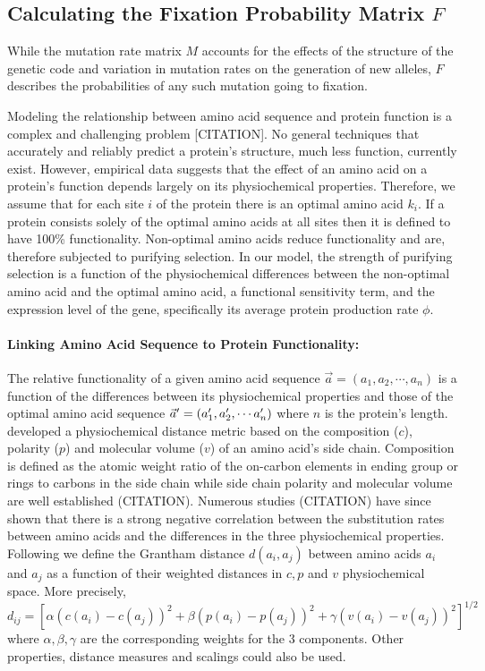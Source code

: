 \subsection*{Calculating the Fixation Probability Matrix $F$}
While the mutation rate matrix $M$ accounts for the effects of the structure of the genetic code and variation in mutation rates on the generation of new alleles,  $F$ describes the probabilities of any such mutation going to fixation.

Modeling the relationship between amino acid sequence and protein function is a complex and challenging problem [CITATION].
No general techniques that accurately and reliably predict a protein's structure, much less function, currently exist.
However, empirical data suggests that the effect of an amino acid on a protein's function depends largely on its physiochemical properties.
Therefore, we assume that for each site $i$ of the protein there is an optimal amino acid $k_i$.
If a protein consists solely of the optimal amino acids at all sites then it is defined to have 100\% functionality. Non-optimal amino acids reduce functionality and are, therefore subjected to purifying selection.
In our model, the strength of purifying selection is a function of the physiochemical differences between the non-optimal amino acid and the optimal amino acid, a functional sensitivity term, and the expression level of the gene, specifically its average protein production rate $\phi$.


\paragraph*{Linking Amino Acid Sequence to  Protein Functionality:}
The relative functionality of a given amino acid sequence $\vec{a} = (a_1, a_2, \cdots, a_n)$  is a function of the differences between its physiochemical properties and those of the optimal amino acid sequence $\vec{a}^\prime = (a^\prime_1, a^\prime_2, \cdots a^\prime_n)$ where $n$ is the protein's length. 
\citet{grantham1974} developed a physiochemical distance metric based on the composition ($c$), polarity ($p$) and molecular volume ($v$) of an amino acid's side chain. 
Composition is defined as the atomic weight ratio of the on-carbon elements in ending group or rings to carbons in the side chain while side chain polarity and molecular volume are well established (CITATION). 
Numerous studies (CITATION) have since shown that there is a strong negative correlation between the substitution rates between amino acids and the differences in the three physiochemical properties. 
Following \citet{grantham1974} we define the Grantham distance $d(a_i, a_j)$ between amino acids $a_i$ and $a_j$ as a function of their weighted distances in $c, p$ and $v$ physiochemical space.
More precisely, $d_{ij} = [\alpha (c(a_i)-c(a_j))^2 + \beta (p(a_i) - p(a_j))^2 + \gamma (v(a_i) - v(a_j))^2]^{1/2}$ where $\alpha, \beta, \gamma$ are the corresponding weights for the 3 components. 
Other properties, distance measures and scalings could also be used.



